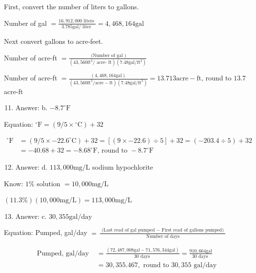 \documentclass[10pt]{article}
\begin{document}
First, convert the number of liters to gallons.

Number of gal $=\frac{16,912,000 \text { liters }}{3.785 \mathrm{gal} / \text { liter }}=4,468,164 \mathrm{gal}$

Next convert gallons to acre-feet.

Number of acre-ft $=\frac{\text { (Number of gal })}{\left(43,560 \mathrm{ft}^{3} / \text { acre- } \mathrm{ft}\right)\left(7.48 \mathrm{gal} / \mathrm{ft}^{3}\right)}$

Number of acre-ft $=\frac{(4,468,164 \mathrm{gal})}{\left(43,560 \mathrm{ft}^{3} / \mathrm{acre}-\mathrm{ft}\right)\left(7.48 \mathrm{gal} / \mathrm{ft}^{3}\right)}=13.713 \mathrm{acre}-\mathrm{ft}$, round to $13.7$ acre-ft

\begin{enumerate}
  \setcounter{enumi}{10}
  \item Answer: b. $-8.7^{\circ} \mathrm{F}$
\end{enumerate}

Equation: ${ }^{\circ} \mathrm{F}=\left(9 / 5 \times{ }^{\circ} \mathrm{C}\right)+32$

$$
\begin{aligned}
{ }^{\circ} \mathrm{F} &=\left(9 / 5 \times-22.6^{\circ} \mathrm{C}\right)+32=[(9 \times-22.6) \div 5]+32=(-203.4 \div 5)+32 \\
&=-40.68+32=-8.68^{\circ} \mathrm{F} \text {, round to }-8.7^{\circ} \mathrm{F}
\end{aligned}
$$

\begin{enumerate}
  \setcounter{enumi}{11}
  \item Answer: d. $113,000 \mathrm{mg} / \mathrm{L}$ sodium hypochlorite
\end{enumerate}

Know: $1 \%$ solution $=10,000 \mathrm{mg} / \mathrm{L}$

$(11.3 \%)(10,000 \mathrm{mg} / \mathrm{L})=113,000 \mathrm{mg} / \mathrm{L}$

\begin{enumerate}
  \setcounter{enumi}{12}
  \item Answer: c. $30,355 \mathrm{gal} / \mathrm{day}$
\end{enumerate}

Equation: Pumped, gal/day $=\frac{\text { (Last read of gal pumped }-\text { First read of gallons pumped) }}{\text { Number of days }}$

$$
\begin{aligned}
\text { Pumped, gal/day } &=\frac{(72,487,008 \mathrm{gal}-71,576,344 \mathrm{gal})}{30 \text { days }}=\frac{910,664 \mathrm{gal}}{30 \text { days }} \\
&=30,355.467, \text { round to } 30,355 \text { gal/day }
\end{aligned}
$$
\end{document}
